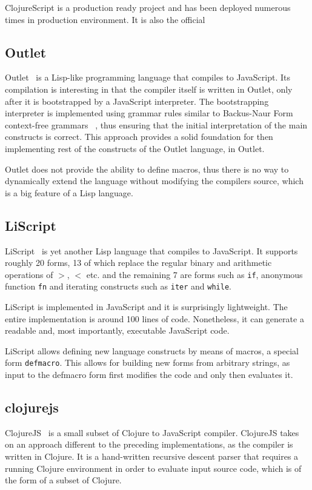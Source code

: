 ClojureScript is a production ready project and has been deployed numerous times in production environment. It is also the official 

\subsection{Outlet}
Outlet~\cite{Outlet:2013:Site} is a Lisp-like programming language that compiles to JavaScript. Its compilation is interesting in that the compiler itself is written in Outlet, only after it is bootstrapped by a JavaScript interpreter.
The bootstrapping interpreter is implemented using grammar rules similar to Backus-Naur Form context-free grammars ~\cite{RecursiveDescentParserJS:2013:Site}, thus ensuring that the initial interpretation of the main constructs is correct. This approach provides a solid foundation for then implementing rest of the constructs of the Outlet language, in Outlet.

Outlet does not provide the ability to define macros, thus there is no way to dynamically extend the language without modifying the compilers source, which is a big feature of a Lisp language.

\subsection{LiScript}
LiScript~\cite{LiScript:2013:Site} is yet another Lisp language that compiles to JavaScript. It supports roughly 20 forms, 13 of which replace the regular binary and arithmetic operations of \texttt{$>$}, \texttt{$<$} etc. and the remaining 7 are forms such as \texttt{if}, anonymous function \texttt{fn} and iterating constructs such as \texttt{iter} and \texttt{while}.

LiScript is implemented in JavaScript and it is surprisingly lightweight. The entire implementation is around 100 lines of code. Nonetheless, it can generate a readable and, most importantly, executable JavaScript code. 

LiScript allows defining new language constructs by means of macros, a special form \texttt{defmacro}. This allows for building new forms from arbitrary strings, as input to the defmacro form first modifies the code and only then evaluates it. 

\subsection{clojurejs}
ClojureJS~\cite{ClojureJS:2011:Site} is a small subset of Clojure to JavaScript compiler.
ClojureJS takes on an approach different to the preceding implementations, as the compiler is written in Clojure. 
It is a hand-written recursive descent parser that requires a running Clojure environment in order to evaluate input source code, which is of the form of a subset of Clojure.

